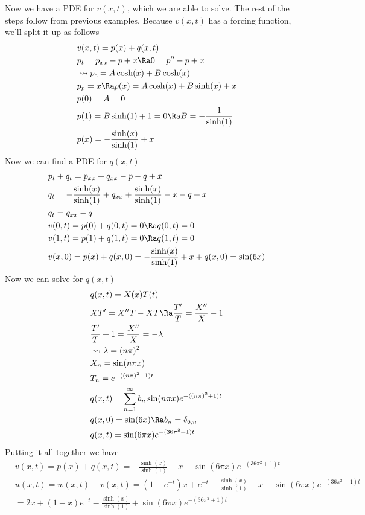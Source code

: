 Now we have a PDE for $v(x,t)$, which we are able to solve. The rest of the steps follow from previous examples. Because $v(x,t)$ has a forcing function, we'll split it up as follows
\begin{align*}
    &v(x,t)=p(x)+q(x,t)\\
    &p_t=p_{xx}-p+x\Ra 0=p''-p+x\\
    &\leadsto p_c=A\cosh(x)+B\cosh(x)\\
    &p_p=x\Ra p(x)=A\cosh(x)+B\sinh(x)+x\\
    &p(0)=A=0\\
    &p(1)=B\sinh(1)+1=0\Ra B=-\frac{1}{\sinh(1)}\\
    &p(x)=-\frac{\sinh(x)}{\sinh(1)}+x
\end{align*}
Now we can find a PDE for $q(x,t)$
\begin{align*}
    &p_t+q_t=p_{xx}+q_{xx}-p-q+x\\
    &q_t=-\frac{\sinh(x)}{\sinh(1)}+q_{xx}+\frac{\sinh(x)}{\sinh(1)}-x-q+x\\
    &q_t=q_{xx}-q\\
    &v(0,t)=p(0)+q(0,t)=0\Ra q(0,t)=0\\
    &v(1,t)=p(1)+q(1,t)=0\Ra q(1,t)=0\\
    &v(x,0)=p(x)+q(x,0)=-\frac{\sinh(x)}{\sinh(1)}+x+q(x,0)=\sin(6x)
\end{align*}
Now we can solve for $q(x,t)$
\begin{align*}
    &q(x,t)=X(x)T(t)\\
    &XT'=X''T-XT\Ra \frac{T'}{T}=\frac{X''}{X}-1\\
    &\frac{T'}{T}+1=\frac{X''}{X}=-\lambda\\
    &\leadsto \lambda=(n\pi)^2\\
    &X_n=\sin(n\pi x)\\
    &T_n=e^{-((n\pi)^2+1)t}\\
    &q(x,t)=\sum_{n=1}^\infty b_n\sin(n\pi x)e^{-((n\pi)^2+1)t}\\
    &q(x,0)=\sin(6x)\Ra b_n=\delta_{6,n}\\
    &q(x,t)=\sin(6\pi x)e^{-(36\pi^2+1)t}
\end{align*}
Putting it all together we have
\begin{align*}
    &v(x,t)=p(x)+q(x,t)=-\frac{\sinh(x)}{\sinh(1)}+x+\sin(6\pi x)e^{-(36\pi^2+1)t}\\
    &u(x,t)=w(x,t)+v(x,t)=(1-e^{-t})x+e^{-t}-\frac{\sinh(x)}{\sinh(1)}+x+\sin(6\pi x)e^{-(36\pi^2+1)t}\\
    &=2x+(1-x)e^{-t}-\frac{\sinh(x)}{\sinh(1)}+\sin(6\pi x)e^{-(36\pi^2+1)t}
\end{align*}

